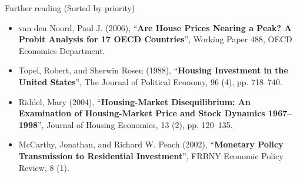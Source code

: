 \documentclass[11pt,lineno]{../_configs}
\begin{document}
\begin{redbox}{Further reading (Sorted by priority)}
	\begin{itemize}
		\item van den Noord, Paul J. (2006), ``\textbf{Are House Prices Nearing a Peak? A Probit 		Analysis for 17 OECD Countries}'', Working Paper 488, OECD Economics 	Department.
		\item Topel, Robert, and Sherwin Rosen (1988), ``\textbf{Housing Investment in the United States}'', The Journal of Political Economy, 96 (4), pp. 718–740.
		\item Riddel, Mary (2004), ``\textbf{Housing-Market Disequilibrium: An Examination of Housing-Market Price and Stock Dynamics 1967–1998}'', Journal of Housing Economics, 13 (2), pp. 120–135.
		\item McCarthy, Jonathan, and Richard W. Peach (2002), ``\textbf{Monetary Policy
		Transmission to Residential Investment}'', FRBNY Economic Policy Review, 8 (1).
	\end{itemize}
\end{redbox}

\printbibliography
	
\end{document}

